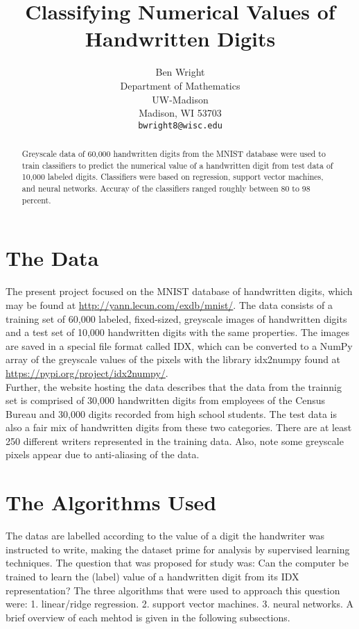 \documentclass{article}
\title{Classifying Numerical Values of Handwritten Digits}
\author{
  Ben Wright \\
  Department of Mathematics\\
  UW-Madison\\
  Madison, WI 53703 \\
  \texttt{bwright8@wisc.edu} \\
}
\begin{document}
\maketitle

\begin{abstract}
  Greyscale data of 60,000 handwritten digits from the MNIST database were used to train classifiers to predict the numerical value of a handwritten digit from test data of 10,000 labeled digits. Classifiers were based on regression, support vector machines, and neural networks. Accuray of the classifiers ranged roughly between 80 to 98 percent.
\end{abstract}

\section{The Data}

The present project focused on the MNIST database of handwritten digits, which may be found at \url{http://yann.lecun.com/exdb/mnist/}. The data consists of  a training set of 60,000 labeled, fixed-sized, greyscale images of handwritten digits and a test set of 10,000 handwritten digits with the same properties. The images are saved in a special file format called IDX, which can be converted to a NumPy array of the greyscale values of the pixels with the library idx2numpy found at \url{https://pypi.org/project/idx2numpy/}. \\


Further, the website hosting the data describes that the data from the trainnig set is comprised of 30,000 handwritten digits from employees of the Census Bureau and 30,000 digits recorded from high school students. The test data is also a fair mix of handwritten digits from these two categories. There are at least 250 different writers represented in the training data. Also, note some greyscale pixels appear due to anti-aliasing of the data. 


\section{The Algorithms Used}

The datas are labelled according to the value of a digit the handwriter was instructed to write, making the dataset prime for analysis by supervised learning techniques. The question that was proposed for study was: Can the computer be trained to learn the (label) value of a handwritten digit from its IDX representation? The three algorithms that were used to approach this question were: 1. linear/ridge regression. 2. support vector machines. 3. neural networks. A brief overview of each mehtod is given in the following subsections. 
\end{document}

